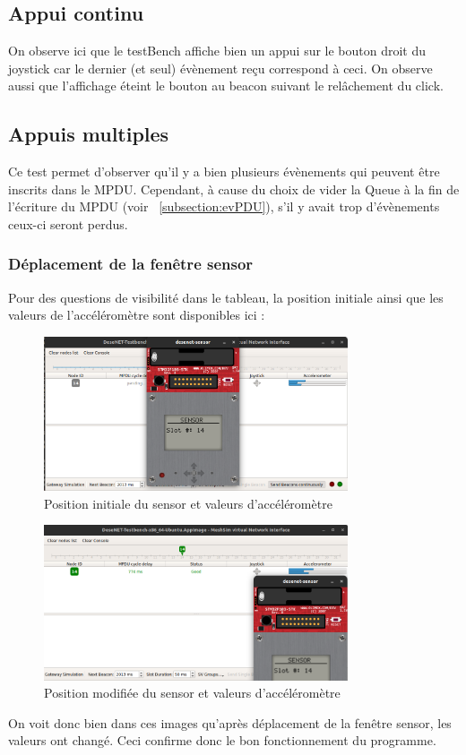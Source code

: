\documentclass{report}
\begin{document}
\subsection{Appui continu}
\label{subsection:AppuiContinu}
On observe ici que le testBench affiche bien un appui sur le bouton droit du joystick car le dernier (et seul) évènement reçu correspond à ceci. On observe aussi que l'affichage éteint le bouton au beacon suivant le relâchement du click.
\subsection{Appuis multiples}
\label{subsection:AppuisMultiples}
Ce test permet d'observer qu'il y a bien plusieurs évènements qui peuvent être inscrits dans le MPDU. Cependant, à cause du choix de vider la Queue à la fin de l'écriture du MPDU (voir ~\ref{subsection:evPDU}), s'il y avait trop d'évènements ceux-ci seront perdus.
\subsubsection{Déplacement de la fenêtre sensor}
\label{subsection:SensorMove}
Pour des questions de visibilité dans le tableau, la position initiale ainsi que les valeurs de l'accéléromètre sont disponibles ici :\\
\begin{figure}[H]
    \centering
    \includegraphics[width= 0.8\textwidth]{Images/SensorInitPos.png}
    \caption{Position initiale du sensor et valeurs d'accéléromètre}
    \label{fig:SensorInitPos}
\end{figure}
\begin{figure}[H]
    \centering
    \includegraphics[width= 0.8\textwidth]{Images/SensorPos2.png}
    \caption{Position modifiée du sensor et valeurs d'accéléromètre}
    \label{fig:SensorPos2}
\end{figure}
On voit donc bien dans ces images qu'après déplacement de la fenêtre sensor, les valeurs ont changé. Ceci confirme donc le bon fonctionnement du programme.
\end{document}
